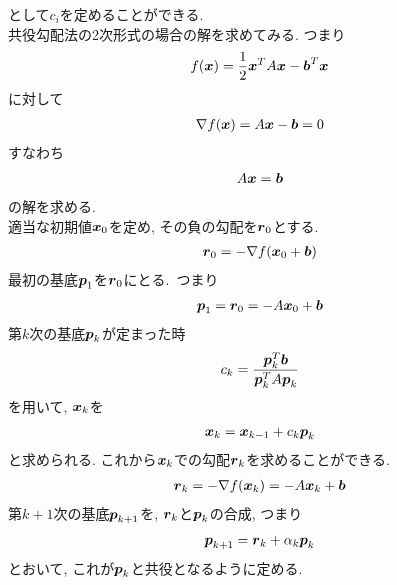 として$c_{i}$を定めることができる.\\[0.5cm]
共役勾配法の2次形式の場合の解を求めてみる. つまり
\begin{eqnarray*}
    f(\mbox{\boldmath $x$})=\frac{1}{2}\mbox{\boldmath $x$}^{T}A\mbox{\boldmath $x$}-\mbox{\boldmath $b$}^{T}\mbox{\boldmath $x$}
\end{eqnarray*}
に対して
\begin{eqnarray*}
    \nabla f(\mbox{\boldmath $x$})=A\mbox{\boldmath $x$}-\mbox{\boldmath $b$}=0
\end{eqnarray*}
すなわち
\begin{eqnarray*}
    A\mbox{\boldmath $x$}=\mbox{\boldmath $b$}
\end{eqnarray*}
の解を求める.\\
適当な初期値$\mbox{\boldmath $x$}_{0}$を定め, その負の勾配を$\mbox{\boldmath $r$}_{0}$とする.
\begin{eqnarray*}
    \mbox{\boldmath $r$}_{0}=-\nabla f(\mbox{\boldmath $x$}_{0}+\mbox{\boldmath $b$})
\end{eqnarray*}
最初の基底$\mbox{\boldmath $p$}_{1}$を$\mbox{\boldmath $r$}_{0}$にとる.\ つまり
\begin{eqnarray*}
    \mbox{\boldmath $p$}_{1}=\mbox{\boldmath $r$}_{0}=-A\mbox{\boldmath $x$}_{0}+\mbox{\boldmath $b$}
\end{eqnarray*}
第$k$次の基底$\mbox{\boldmath $p$}_{k}$が定まった時
\begin{eqnarray*}
    c_{k}=\frac{\mbox{\boldmath $p$}_{k}^{T}\mbox{\boldmath $b$}}{\mbox{\boldmath $p$}_{k}^{T}A\mbox{\boldmath $p$}_{k}}
\end{eqnarray*}
を用いて, $\mbox{\boldmath $x$}_{k}$を
\begin{eqnarray*}
    \mbox{\boldmath $x$}_{k}=\mbox{\boldmath $x$}_{k-1}+c_{k}\mbox{\boldmath $p$}_{k}
\end{eqnarray*}
と求められる. これから$\mbox{\boldmath $x$}_{k}$での勾配$\mbox{\boldmath $r$}_{k}$を求めることができる.
\begin{eqnarray*}
    \mbox{\boldmath $r$}_{k}=-\nabla f(\mbox{\boldmath $x$}_{k})=-A\mbox{\boldmath $x$}_{k}+\mbox{\boldmath $b$}
\end{eqnarray*}
第$k+1$次の基底$\mbox{\boldmath $p$}_{k+1}$を, $\mbox{\boldmath $r$}_{k}$と$\mbox{\boldmath $p$}_{k}$の合成, つまり
\begin{eqnarray*}
    \mbox{\boldmath $p$}_{k+1}=\mbox{\boldmath $r$}_{k}+\alpha_{k}\mbox{\boldmath $p$}_{k}
\end{eqnarray*}
とおいて, これが$\mbox{\boldmath $p$}_{k}$と共役となるように定める.\\
